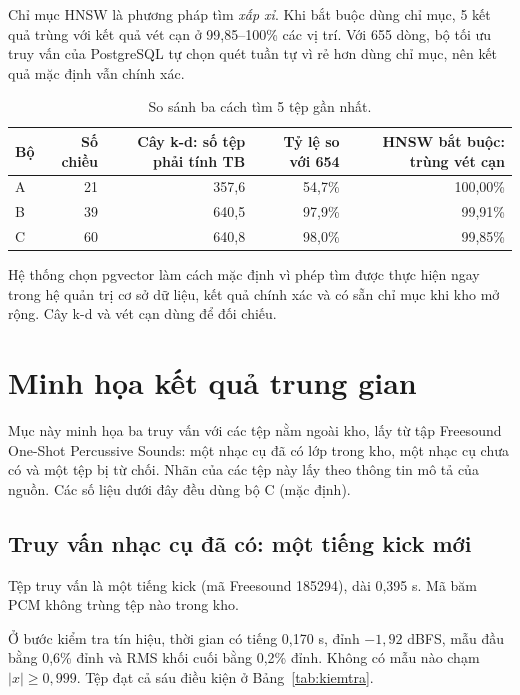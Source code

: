 \documentclass[11pt,a4paper]{article}
\begin{document}
Chỉ mục HNSW là phương pháp tìm \emph{xấp xỉ}. Khi bắt buộc dùng chỉ mục, 5 kết quả trùng với kết quả vét cạn ở 99,85--100\% các vị trí. Với 655 dòng, bộ tối ưu truy vấn của PostgreSQL tự chọn quét tuần tự vì rẻ hơn dùng chỉ mục, nên kết quả mặc định vẫn chính xác.
\begin{table}[htbp]
\centering\small
\caption{So sánh ba cách tìm 5 tệp gần nhất.}\label{tab:cachtim}
\begin{tabular}{lrrrr}
\toprule
Bộ & Số chiều & Cây k-d: số tệp phải tính TB & Tỷ lệ so với 654 & HNSW bắt buộc: trùng vét cạn\\\midrule
A & 21 & 357,6 & 54,7\% & 100,00\%\\
B & 39 & 640,5 & 97,9\% & 99,91\%\\
C & 60 & 640,8 & 98,0\% & 99,85\%\\\bottomrule
\end{tabular}
\end{table}
Hệ thống chọn pgvector làm cách mặc định vì phép tìm được thực hiện ngay trong hệ quản trị cơ sở dữ liệu, kết quả chính xác và có sẵn chỉ mục khi kho mở rộng. Cây k-d và vét cạn dùng để đối chiếu.

\section{Minh họa kết quả trung gian}\label{sec:minhhoa}
Mục này minh họa ba truy vấn với các tệp nằm ngoài kho, lấy từ tập Freesound One-Shot Percussive Sounds: một nhạc cụ đã có lớp trong kho, một nhạc cụ chưa có và một tệp bị từ chối. Nhãn của các tệp này lấy theo thông tin mô tả của nguồn. Các số liệu dưới đây đều dùng bộ C (mặc định).

\subsection{Truy vấn nhạc cụ đã có: một tiếng kick mới}
Tệp truy vấn là một tiếng kick (mã Freesound 185294), dài 0,395 s. Mã băm PCM không trùng tệp nào trong kho.

Ở bước kiểm tra tín hiệu, thời gian có tiếng 0,170 s, đỉnh $-1{,}92$ dBFS, mẫu đầu bằng 0,6\% đỉnh và RMS khối cuối bằng 0,2\% đỉnh. Không có mẫu nào chạm $|x|\ge0{,}999$. Tệp đạt cả sáu điều kiện ở Bảng~\ref{tab:kiemtra}.
\end{document}
